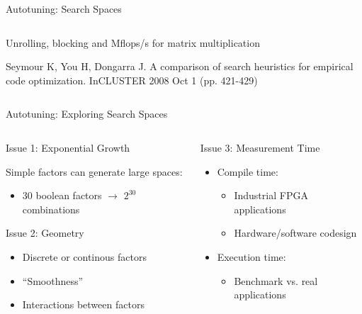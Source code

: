\documentclass[10pt, compress, aspectratio=169, xcolor={table,usenames,dvipsnames}]{beamer}
\begin{document}
\begin{frame}[label={sec:orgb4a4ab5}]{Autotuning: Search Spaces}
\begin{columns}
\begin{column}{0.6\columnwidth}
\begin{center}
\alert{Unrolling}, \alert{blocking} and \alert{Mflops/s} for \alert{matrix multiplication}

\vspace{.1cm}

\scriptsize{Seymour K, You H, Dongarra J. A comparison of search heuristics for empirical code optimization. InCLUSTER 2008 Oct 1 (pp. 421-429)}
\end{center}
\end{column}
\end{columns}
\end{frame}

\begin{frame}[label={sec:org1b99610}]{Autotuning: Exploring Search Spaces}
\begin{columns}
\begin{column}{0.5\columnwidth}
\begin{block}{Issue 1: \alert{Exponential Growth}}
\vspace{.2cm}

\alert{Simple factors} can generate \alert{large spaces}:

\begin{itemize}
\item 30 \alert{boolean} factors \(\rightarrow\) \(2^{30}\) combinations
\end{itemize}

\begin{block}{Issue 2: \alert{Geometry}}
\begin{itemize}
\item \alert{Discrete} or \alert{continous} factors
\item \alert{``Smoothness''}
\item \alert{Interactions} between factors
\end{itemize}
\end{block}
\end{block}
\end{column}

\begin{column}{0.5\columnwidth}
\begin{block}{Issue 3: \alert{Measurement Time}}
\vspace{.2cm}

\begin{itemize}
\item \alert{Compile} time:
\begin{itemize}
\item Industrial \alert{FPGA} applications
\item \alert{Hardware/software codesign}
\end{itemize}
\item \alert{Execution} time:
\begin{itemize}
\item \alert{Benchmark} vs. \alert{real applications}
\end{itemize}
\end{itemize}
\end{block}
\end{column}
\end{columns}
\end{frame}
\end{document}
